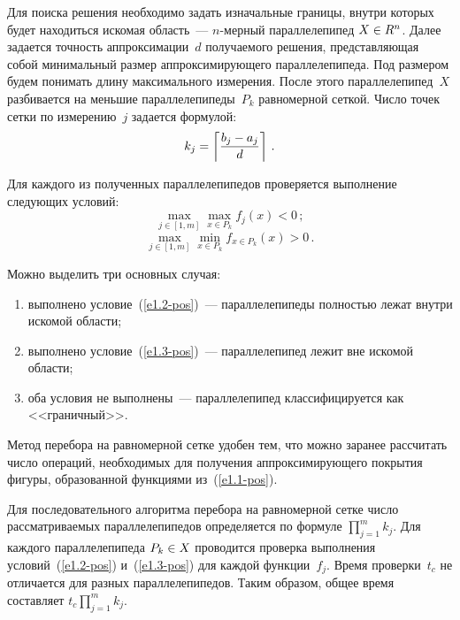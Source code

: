 \begin{multicols}{2}
     Для поиска решения необходимо задать изначальные границы, внутри 
которых будет находиться искомая область~--- $n$-мер\-ный параллелепипед 
$X\hm\in R^n$. Далее задается точность аппроксимации~$d$ получаемого 
решения, представляющая собой минимальный размер аппроксимирующего 
параллелепипеда. Под размером будем понимать длину максимального 
измерения. После этого параллелепипед~${X}$ разбивается на 
меньшие параллелепипеды~$P_k$ равномерной сеткой. Число точек сетки по 
измерению~$j$  задается формулой:
 $$
 k_j= \left\lceil \displaystyle\frac{\displaystyle b_j- a_j\mathstrut}{\displaystyle d\mathstrut}\right\rceil\,.
 $$
 
  Для 
каждого из полученных параллелепипедов проверяется выполнение следующих 
условий:
     \begin{equation}
     \max\limits_{j\in [1,m]} \max\limits_{x\in P_k} f_j(x)<0\,;
     \label{e1.2-pos}
     \end{equation}
\begin{equation}
\max\limits_{j\in [1,m]} \min\limits_{x\in P_k} f_{x\in P_k}(x)>0\,.
\label{e1.3-pos}
\end{equation}

Можно выделить три основных случая:
\begin{enumerate}[(1)]
\item выполнено условие~(\ref{e1.2-pos})~--- параллелепипеды полностью 
лежат внутри искомой области;
\item выполнено условие~(\ref{e1.3-pos})~--- параллелепипед лежит вне 
искомой области;
\item оба условия не выполнены~--- параллелепипед классифицируется как 
<<граничный>>.
\end{enumerate}

     Метод перебора на равномерной сетке удобен тем, что можно заранее 
рассчитать число операций, необходимых для получения аппроксимирующего 
покрытия фигуры, образованной функциями из~(\ref{e1.1-pos}). 
     
     Для последовательного алгоритма перебора на равномерной сетке число 
рассматриваемых параллелепипедов определяется по формуле 
$\prod\nolimits^m_{j=1} k_j$. Для каждого параллелепипеда $P_k\hm\in X$ 
проводится проверка выполнения условий~(\ref{e1.2-pos}) и~(\ref{e1.3-pos}) для 
каждой функции~$f_j$. Время проверки~$t_c$ не отличается для разных 
параллелепипедов. Таким образом, общее время составляет $t_c  
\prod\nolimits^m_{j=1} k_j$. 
      

\end{multicols}
